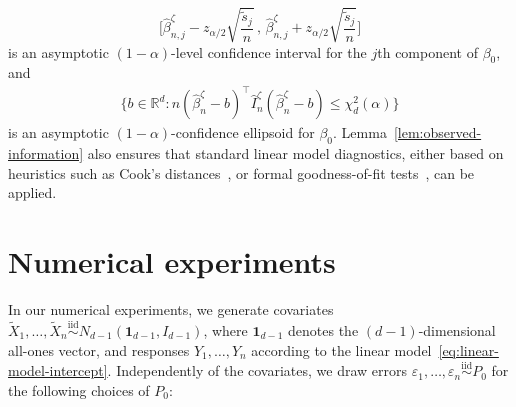 \documentclass[a4paper]{article}
\newcommand{\R}{\mathbb{R}}
\newcommand{\iid}{\overset{\mathrm{iid}}{\sim}}
\theoremstyle{definition}
\begin{document}
\[
\biggl[\hat{\beta}_{n,j}^\zeta - z_{\alpha/2}\sqrt{\frac{\tilde{s}_j}{n}} \, , \, \hat{\beta}_{n,j}^\zeta + z_{\alpha/2}\sqrt{\frac{\tilde{s}_j}{n}}\biggl]
\]
is an asymptotic $(1-\alpha)$-level confidence interval for the $j$th component of $\beta_0$, and
\begin{align}
\label{eq:confidence ellipsoid}
\bigl\{b \in \R^d: n(\hat{\beta}_n^\zeta - b)^\top\hat{I}_n^\zeta (\hat{\beta}_n^\zeta - b) \leq \chi_d^2(\alpha)\bigr\}
\end{align}
is an asymptotic $(1 - \alpha)$-confidence ellipsoid for $\beta_0$. 
Lemma~\ref{lem:observed-information} also ensures that standard linear model diagnostics, either based on heuristics such as Cook's distances~\citep{cook1977detection}, or formal goodness-of-fit tests~\citep{jankova2020goodness}, can be applied. 

\section{Numerical experiments}
\label{sec:experiments}

In our numerical experiments, we generate covariates $\tilde{X}_1,\dotsc, \tilde{X}_n \iid N_{d-1}(\mathbf{1}_{d-1}, I_{d-1})$, where $\mathbf{1}_{d-1}$ denotes the $(d-1)$-dimensional all-ones vector, and responses $Y_1, \dotsc, Y_n$ according to the linear model~\eqref{eq:linear-model-intercept}. Independently of the covariates, we draw errors $\varepsilon_1, \ldots, \varepsilon_n \iid P_0$ for the following choices of $P_0$:
\end{document}
